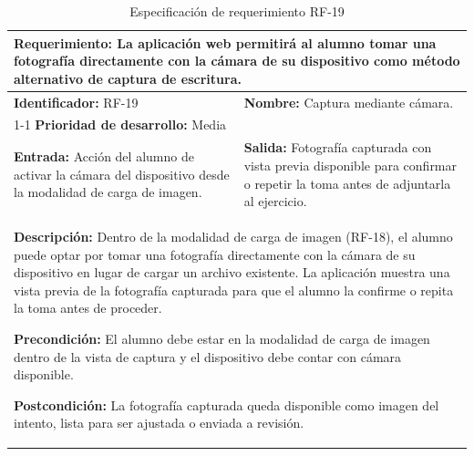 \begin{table}[H]
\caption{Especificación de requerimiento RF-19}
\centering
\renewcommand{\arraystretch}{1.3}
\setlength{\tabcolsep}{6pt}
\begin{tabular}{|p{7cm}|p{8cm}|}
\hline
\multicolumn{2}{|p{15cm}|}{\textbf{Requerimiento:} La aplicación web permitirá al alumno tomar una fotografía directamente con la cámara de su dispositivo como método alternativo de captura de escritura.} \\ \hline
\textbf{Identificador:} RF-19 &
\textbf{Nombre:} Captura mediante cámara. \\ \cline{1-1}
\textbf{Prioridad de desarrollo:} Media &
\multicolumn{1}{p{8cm}|}{} \\ \hline
\textbf{Entrada:} Acción del alumno de activar la cámara del dispositivo desde la modalidad de carga de imagen. &
\textbf{Salida:} Fotografía capturada con vista previa disponible para confirmar o repetir la toma antes de adjuntarla al ejercicio. \\ \hline
\multicolumn{2}{|p{15cm}|}{
\textbf{Descripción:} Dentro de la modalidad de carga de imagen (RF-18), el alumno puede optar por tomar una fotografía directamente con la cámara de su dispositivo en lugar de cargar un archivo existente. La aplicación muestra una vista previa de la fotografía capturada para que el alumno la confirme o repita la toma antes de proceder.

\vspace{0.2cm}
\textbf{Precondición:} El alumno debe estar en la modalidad de carga de imagen dentro de la vista de captura y el dispositivo debe contar con cámara disponible.

\vspace{0.2cm}
\textbf{Postcondición:} La fotografía capturada queda disponible como imagen del intento, lista para ser ajustada o enviada a revisión.
} \\ \hline
\end{tabular}
\label{tab:rf19}
\end{table}

